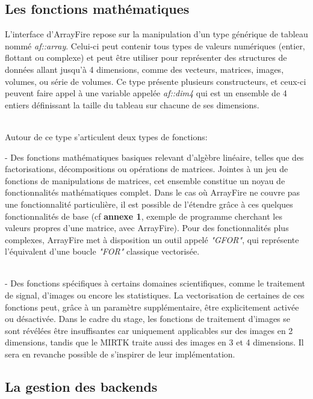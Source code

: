 \documentclass[10pt]{report}
\begin{document}
	\subsection{Les fonctions mathématiques}
	L'interface d'ArrayFire repose sur la manipulation d'un type générique de tableau nommé \textit{af::array}. Celui-ci peut contenir tous types de valeurs numériques (entier, flottant ou complexe) et peut être utiliser pour représenter des structures de données allant jusqu'à 4 dimensions, comme des vecteurs, matrices, images, volumes, ou série de volumes. Ce type présente plusieurs constructeurs, et ceux-ci peuvent faire appel à une variable appelée \textit{af::dim4} qui est un ensemble de 4 entiers définissant la taille du tableau sur chacune de ses dimensions.\\ ~\par 
	
	\noindent Autour de ce type s'articulent deux types de fonctions: ~\par 
	- Des fonctions mathématiques basiques relevant d'algèbre linéaire, telles que des factorisations, décompositions ou opérations de matrices. Jointes à un jeu de fonctions de manipulations de matrices, cet ensemble constitue un noyau de fonctionnalités mathématiques complet. Dans le cas où ArrayFire ne couvre pas une fonctionnalité particulière, il est possible de l'étendre grâce à ces quelques fonctionnalités de base (cf \textbf{annexe 1}, exemple de programme cherchant les valeurs propres d'une matrice, avec ArrayFire). Pour des fonctionnalités plus complexes, ArrayFire met à disposition un outil appelé \textit{"GFOR"}, qui représente l'équivalent d'une boucle \textit{"FOR"} classique vectorisée. \\~\par 
	- Des fonctions spécifiques à certains domaines scientifiques, comme le traitement de signal, d'images ou encore les statistiques. La vectorisation de certaines de ces fonctions peut, grâce à un paramètre supplémentaire, être explicitement activée ou désactivée. Dans le cadre du stage, les fonctions de traitement d'images se sont révélées être insuffisantes car uniquement applicables sur des images en 2 dimensions, tandis que le MIRTK traite aussi des images en 3 et 4 dimensions. Il sera en revanche possible de s'inspirer de leur implémentation.
	\subsection{La gestion des backends}
	
\end{document}
